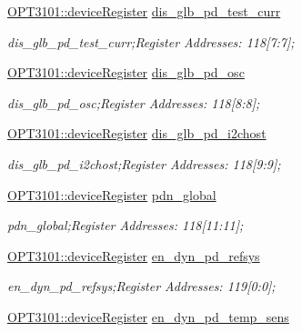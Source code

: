 \begin{DoxyCompactItemize}
\mbox{\hyperlink{class_o_p_t3101_1_1device_register}{O\+P\+T3101\+::device\+Register}} \mbox{\hyperlink{class_o_p_t3101_1_1registers_a20a9e4cfd48ff6cd09f970d07f769438}{dis\+\_\+glb\+\_\+pd\+\_\+test\+\_\+curr}}
\begin{DoxyCompactList}\small\item\em dis\+\_\+glb\+\_\+pd\+\_\+test\+\_\+curr;Register Addresses\+: 118\mbox{[}7\+:7\mbox{]}; \end{DoxyCompactList}\item 
\mbox{\hyperlink{class_o_p_t3101_1_1device_register}{O\+P\+T3101\+::device\+Register}} \mbox{\hyperlink{class_o_p_t3101_1_1registers_a2790406acd1e5fcd1f07ebb6a2066a35}{dis\+\_\+glb\+\_\+pd\+\_\+osc}}
\begin{DoxyCompactList}\small\item\em dis\+\_\+glb\+\_\+pd\+\_\+osc;Register Addresses\+: 118\mbox{[}8\+:8\mbox{]}; \end{DoxyCompactList}\item 
\mbox{\hyperlink{class_o_p_t3101_1_1device_register}{O\+P\+T3101\+::device\+Register}} \mbox{\hyperlink{class_o_p_t3101_1_1registers_a5c05d396e84e3a0a6b62da8de4986002}{dis\+\_\+glb\+\_\+pd\+\_\+i2chost}}
\begin{DoxyCompactList}\small\item\em dis\+\_\+glb\+\_\+pd\+\_\+i2chost;Register Addresses\+: 118\mbox{[}9\+:9\mbox{]}; \end{DoxyCompactList}\item 
\mbox{\hyperlink{class_o_p_t3101_1_1device_register}{O\+P\+T3101\+::device\+Register}} \mbox{\hyperlink{class_o_p_t3101_1_1registers_ab8f03a92cac033306d1b5639a9a41061}{pdn\+\_\+global}}
\begin{DoxyCompactList}\small\item\em pdn\+\_\+global;Register Addresses\+: 118\mbox{[}11\+:11\mbox{]}; \end{DoxyCompactList}\item 
\mbox{\hyperlink{class_o_p_t3101_1_1device_register}{O\+P\+T3101\+::device\+Register}} \mbox{\hyperlink{class_o_p_t3101_1_1registers_ab81d9bb9c0d94666f5d526a379539047}{en\+\_\+dyn\+\_\+pd\+\_\+refsys}}
\begin{DoxyCompactList}\small\item\em en\+\_\+dyn\+\_\+pd\+\_\+refsys;Register Addresses\+: 119\mbox{[}0\+:0\mbox{]}; \end{DoxyCompactList}\item 
\mbox{\hyperlink{class_o_p_t3101_1_1device_register}{O\+P\+T3101\+::device\+Register}} \mbox{\hyperlink{class_o_p_t3101_1_1registers_ab70be3f12be865ebe8c093f18959f813}{en\+\_\+dyn\+\_\+pd\+\_\+temp\+\_\+sens}}

\end{DoxyCompactItemize}
